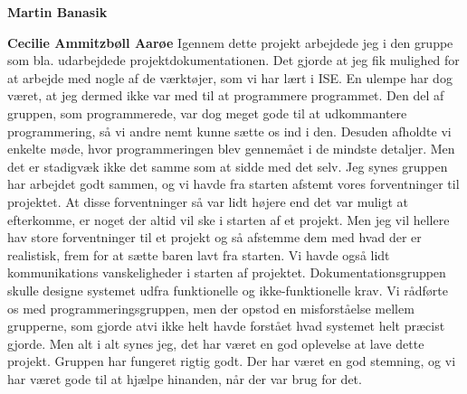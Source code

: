 \textbf{Martin Banasik}

\textbf{Cecilie Ammitzbøll Aarøe}
Igennem dette projekt arbejdede jeg i den gruppe som bla. udarbejdede projektdokumentationen. Det gjorde at jeg fik mulighed for at arbejde med nogle af de værktøjer, som vi har lært i ISE. En ulempe har dog været, at jeg dermed ikke var med til at programmere programmet. Den del af gruppen, som programmerede, var dog meget gode til at udkommantere programmering, så vi andre nemt kunne sætte os ind i den. Desuden afholdte vi enkelte møde, hvor programmeringen blev gennemået i de mindste detaljer. Men det er stadigvæk ikke det samme som at sidde med det selv.
Jeg synes gruppen har arbejdet godt sammen, og vi havde fra starten afstemt vores forventninger til projektet. At disse forventninger så var lidt højere end det var muligt at efterkomme, er noget der altid vil ske i starten af et projekt. Men jeg vil hellere hav store forventninger til et projekt og så afstemme dem med hvad der er realistisk, frem for at sætte baren lavt fra starten.
Vi havde også lidt kommunikations vanskeligheder i starten af projektet. Dokumentationsgruppen skulle designe systemet udfra funktionelle og ikke-funktionelle krav. Vi rådførte os med programmeringsgruppen, men der opstod en misforståelse mellem grupperne, som gjorde atvi ikke helt havde forstået hvad systemet helt præcist gjorde.
Men alt i alt synes jeg, det har været en god oplevelse at lave dette projekt. Gruppen har fungeret rigtig godt. Der har været en god stemning, og vi har været gode til at hjælpe hinanden, når der var brug for det.

